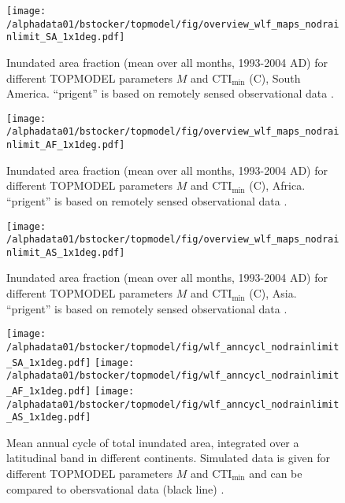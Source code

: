 \begin{figure}[ht!]
\texttt{[image: /alphadata01/bstocker/topmodel/fig/overview\_wlf\_maps\_nodrainlimit\_SA\_1x1deg.pdf]}
\caption[Inundated area fraction for different TOPMODEL parameters $M$ and CTI$_{\text{min}}$ (C), South America]{Inundated area fraction (mean over all months, 1993-2004 AD) for different TOPMODEL parameters $M$ and CTI$_{\text{min}}$ (C), South America. ``prigent'' is based on remotely sensed observational data \citep{prigent07grl}.}
\label{fig:wlftune.map.sa}
\end{figure}

\begin{figure}[ht!]
  \texttt{[image: /alphadata01/bstocker/topmodel/fig/overview\_wlf\_maps\_nodrainlimit\_AF\_1x1deg.pdf]}
\caption[Inundated area fraction for different TOPMODEL parameters $M$ and CTI$_{\text{min}}$ (C), Africa.]{Inundated area fraction (mean over all months, 1993-2004 AD) for different TOPMODEL parameters $M$ and CTI$_{\text{min}}$ (C), Africa. ``prigent'' is based on remotely sensed observational data \citep{prigent07grl}.}
\label{fig:wlftune.map.af}
\end{figure}

\begin{figure}[ht!]
  \texttt{[image: /alphadata01/bstocker/topmodel/fig/overview\_wlf\_maps\_nodrainlimit\_AS\_1x1deg.pdf]}
\caption[Inundated area fraction for different TOPMODEL parameters $M$ and CTI$_{\text{min}}$ (C), Asia]{Inundated area fraction (mean over all months, 1993-2004 AD) for different TOPMODEL parameters $M$ and CTI$_{\text{min}}$ (C), Asia. ``prigent'' is based on remotely sensed observational data \citep{prigent07grl}.}
\label{fig:wlftune.map.as}
\end{figure}

\begin{figure}[ht!]
  \texttt{[image: /alphadata01/bstocker/topmodel/fig/wlf\_anncycl\_nodrainlimit\_SA\_1x1deg.pdf]}
  \texttt{[image: /alphadata01/bstocker/topmodel/fig/wlf\_anncycl\_nodrainlimit\_AF\_1x1deg.pdf]}
  \texttt{[image: /alphadata01/bstocker/topmodel/fig/wlf\_anncycl\_nodrainlimit\_AS\_1x1deg.pdf]}
\caption[Mean annual cycle of total inundated area by continent]{Mean annual cycle of total inundated area, integrated over a latitudinal band in different continents. Simulated data is given for different TOPMODEL parameters $M$ and CTI$_{\text{min}}$ and can be compared to obersvational data (black line) \citep{prigent07grl}. }
\label{fig:wlftune.anncycl}
\end{figure}

